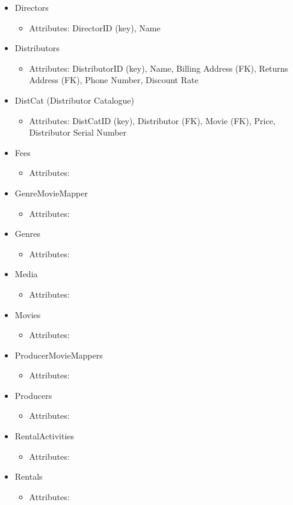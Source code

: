 \documentclass[letterpaper,12pt]{article}
\begin{document}
\begin{itemize}
	\item Directors
	      \begin{itemize}
		      \item Attributes: DirectorID (key), Name
	      \end{itemize}
	\item Distributors
\begin{itemize}
    \item Attributes: DistributorID (key), Name, Billing Address (FK), Returns Address (FK), Phone Number, Discount Rate
\end{itemize}
	\item DistCat (Distributor Catalogue)
	      \begin{itemize}
		      \item Attributes: DistCatID (key), Distributor (FK), Movie (FK), Price, Distributor Serial Number
	      \end{itemize}
	\item Fees
	      \begin{itemize}
		      \item Attributes:
	      \end{itemize}
	\item GenreMovieMapper
	      \begin{itemize}
		      \item Attributes:
	      \end{itemize}
	\item Genres
	      \begin{itemize}
		      \item Attributes:
	      \end{itemize}
	\item Media
	      \begin{itemize}
		      \item Attributes:
	      \end{itemize}
	\item Movies
	      \begin{itemize}
		      \item Attributes:
	      \end{itemize}
	\item ProducerMovieMappers
	      \begin{itemize}
		      \item Attributes:
	      \end{itemize}
	\item Producers
	      \begin{itemize}
		      \item Attributes:
	      \end{itemize}
	\item RentalActivities
	      \begin{itemize}
		      \item Attributes:
	      \end{itemize}
	\item Rentals
	      \begin{itemize}
		      \item Attributes:
	      \end{itemize}
\end{itemize}
\end{document}
